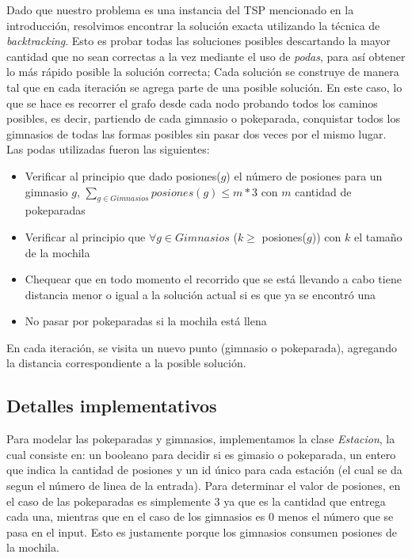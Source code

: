         Dado que nuestro problema es una instancia del TSP mencionado en la introducción, resolvimos encontrar la solución exacta utilizando la técnica de \textit{backtracking}. Esto es probar todas las soluciones posibles descartando la mayor cantidad que no sean correctas a la vez mediante el uso de \textit{podas}, para así obtener lo más rápido posible la solución correcta; Cada solución se  construye de manera tal que en cada iteración se agrega parte de una posible solución. En este caso, lo que se hace es recorrer el grafo desde cada nodo probando todos los caminos posibles, es decir, partiendo de cada gimnasio o pokeparada, conquistar todos los gimnasios de todas las formas posibles sin pasar dos veces por el mismo lugar. Las podas utilizadas fueron las siguientes:
            \begin{itemize}
                \item{Verificar al principio que dado posiones($g$) el número de posiones para un gimnasio $g$, \newline $\sum_{g \in Gimnasios} posiones(g) \leq m*3$ con $m$ cantidad de pokeparadas}
                \item{Verificar al principio que $\forall g \in Gimnasios$ ($k \geq$ posiones($g$)) con $k$ el tamaño de la mochila}
                \item{Chequear que en todo momento el recorrido que se está llevando a cabo tiene distancia menor o igual a la solución actual si es que ya se encontró una}
                \item{No pasar por pokeparadas si la mochila está llena}
            \end{itemize}

        En cada iteración, se visita un nuevo punto (gimnasio o pokeparada), agregando la distancia correspondiente a la posible solución.


        \subsection{Detalles implementativos}
            Para modelar las pokeparadas y gimnasios, implementamos la clase \textit{Estacion}, la cual consiste en: un booleano para decidir si es gimasio o pokeparada, un entero que indica la cantidad de posiones y un id único para cada estación (el cual se da segun el número de linea de la entrada). Para determinar el valor de posiones, en el caso de las pokeparadas es simplemente 3 ya que es la cantidad que entrega cada una, mientras que en el caso de los gimnasios es 0 menos el número que se pasa en el input. Esto es justamente porque los gimnasios consumen posiones de la mochila.


